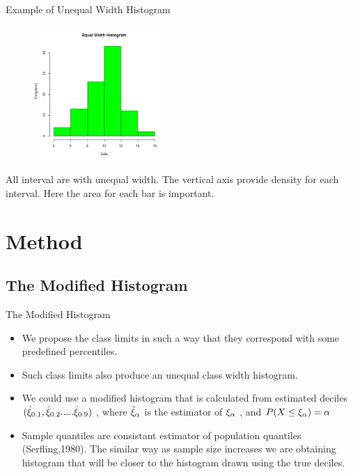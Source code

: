 \documentclass{beamer}
\begin{document}
\begin{frame}{Example of Unequal Width Histogram}

\begin{figure}[t]
       	\includegraphics[width=2in]{equal}
  \centering
\end{figure}
All interval are with unequal width. The vertical axis provide density for each interval. Here the area for each bar is important.
\end{frame}

\section{Method}

\subsection{The Modified Histogram}

\begin{frame}{The Modified Histogram}
	\begin{itemize}
		\item We propose the class limits in such a way that they correspond with some predefined percentiles.
		\item Such class limits also produce an unequal class width histogram.
 		\item We could use a modified histogram that is calculated from estimated deciles $ ( {\hat\xi_{\small0.1}}, {\hat\xi_{\small0.2}}.....{\hat\xi_{0.9}})$ , where  $ {\hat\xi_{\small \alpha}}$ is the estimator of  $ {\xi_{\small \alpha}}$ , and  $P (X \leq {\xi_{\small \alpha}} ) = \large{ \alpha} $ 

		\item Sample quantiles are consistant estimator of population quantiles (Serfling,1980). The similar way as sample size increases we are obtaining histogram that will be closer to the histogram drawn using the true deciles.

	\end{itemize}
\end{frame}
\end{document}

